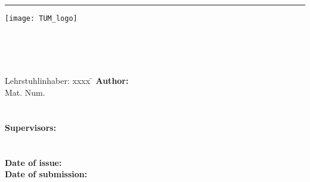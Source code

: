 \thispagestyle{empty}
\begin{changemargin}{-0.5cm}{0cm} 
\vspace*{-2.0cm}
\rule{10mm}{0pt}
\hfill
\texttt{[image: TUM\_logo]}
\\[0.75cm]
\vspace*{-0.5cm}
\begin{spacing}{2.0}
	{{\huge{\textbf{\DAthema}}}} %
\end{spacing}
\ \\[32ex]
{\Large{{\DAtype}}}\\[-1ex]
\ \\
\begin{tabbing}
Lehrstuhlinhaber: xxxx   \= \DAprofessor \kill %
\textbf{Author:}      \> \DAautor \\[1ex]
                      \> Mat. Num. \Matrikel \\[1ex]
                      \> \DAautorAnschrift \\[1ex]
                      \> \DAautoremail \\[3ex]
\textbf{Supervisors:}       \> \DAbetreuer\\[1ex]
                   \> \DAprofessor \\[1ex]
    \> \DALehrstuhl \\[2ex]
\textbf{Date of issue:}   \> \DAausgabe \\[1ex]
\textbf{Date of submission:}    \> \DAabgabe
\end{tabbing}
\cleardoublepage
\end{changemargin}